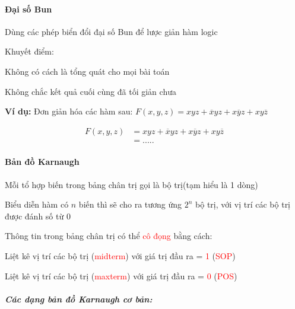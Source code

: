 \documentclass[12pt]{article}
\newcommand{\SubItem}[1]{
    {\setlength\itemindent{15pt} \item[-] #1}
}
\begin{document}
\begin{sloppypar}
\paragraph{Đại số Bun}
\begin{itemize}
    \item Dùng các phép biển đổi đại số Bun để lược giản hàm logic
    \item Khuyết điểm:
        \SubItem{Không có cách là tổng quát cho mọi bài toán}
        \SubItem{Không chắc kết quả cuối cùng đã tối giản chưa}  
\end{itemize}

\begin{tcolorbox}
    \textbf{Ví dụ:} Đơn giản hóa các hàm sau:
    \(F(x,y,z) = xyz + \overline{x}yz + x\overline{y}z + xy\overline{z}\)
\end{tcolorbox}

\begin{align*}
    F(x,y,z)    & = xyz + \overline{x}yz + x\overline{y}z + xy\overline{z} \\
                & = .....
\end{align*}


\paragraph{Bản đồ Karnaugh}\mbox{}

Mỗi tổ hợp biến trong bảng chân trị gọi là bộ trị(tạm hiểu là 1 dòng)
\begin{itemize}
    \item Biểu diễn hàm có \(n\) biến thì sẽ cho ra tương ứng \(2^{n}\) bộ trị, với vị trí các bộ trị được đánh số từ 0
    \item Thông tin trong bảng chân trị có thể \textcolor{red}{cô đọng} bằng cách:
        \SubItem {Liệt kê vị trí các bộ trị (\textcolor{red}{midterm}) với giá trị đầu ra = \textcolor{red}{1} (\textcolor{red}{SOP})}
        \SubItem {Liệt kê vị trí các bộ trị (\textcolor{red}{maxterm}) với giá trị đầu ra = \textcolor{red}{0} (\textcolor{red}{POS})}
\end{itemize}


\subparagraph{Các dạng bản đồ Karnaugh cơ bản:}
\subparagraph{}


\end{sloppypar}
\end{document}

